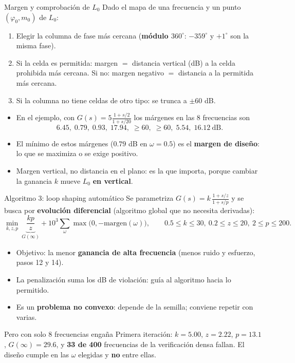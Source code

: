 \documentclass[aspectratio=169,11pt]{beamer}
\begin{document}
\begin{frame}{Margen y comprobación de $L_0$}
  \small
  Dado el mapa de una frecuencia y un punto $(\varphi_0,m_0)$ de $L_0$:
  \begin{enumerate}
    \item Elegir la columna de fase más cercana (\textbf{módulo $360^\circ$}: $-359^\circ$ y $+1^\circ$ son la misma fase).
    \item Si la celda es permitida: margen $=$ distancia vertical (dB) a la celda prohibida más cercana. Si no: margen negativo $=$ distancia a la permitida más cercana.
    \item Si la columna no tiene celdas de otro tipo: se trunca a $\pm60$ dB.
  \end{enumerate}
  \begin{itemize}
    \item En el ejemplo, con $G(s)=5\frac{1+s/2}{1+s/20}$ los márgenes en las 8 frecuencias son
    \[ 6.45,\;0.79,\;0.93,\;17.94,\;\ge60,\;\ge60,\;5.54,\;16.12\ \text{dB}. \]
    \item El mínimo de estos márgenes ($0.79$ dB en $\omega=0.5$) es el \textbf{margen de diseño}: lo que se maximiza o se exige positivo.
    \item Margen vertical, no distancia en el plano: es la que importa, porque cambiar la ganancia $k$ mueve $L_0$ \textbf{en vertical}.
  \end{itemize}
\end{frame}

\begin{frame}{Algoritmo 3: loop shaping automático}
  \footnotesize
  Se parametriza $G(s)=k\,\frac{1+s/z}{1+s/p}$ y se busca por \textbf{evolución diferencial} (algoritmo global que no necesita derivadas):
  \[ \min_{k,z,p}\ \underbrace{\frac{kp}{z}}_{G(\infty)}+10^3\sum_\omega\max\big(0,-\text{margen}(\omega)\big),\qquad 0.5\le k\le30,\ 0.2\le z\le20,\ 2\le p\le200. \]
  \begin{itemize}
    \item Objetivo: la menor \textbf{ganancia de alta frecuencia} (menos ruido y esfuerzo, pasos 12 y 14).
    \item La penalización suma los dB de violación: guía al algoritmo hacia lo permitido.
    \item Es un \textbf{problema no convexo}: depende de la semilla; conviene repetir con varias.
  \end{itemize}
  \begin{alertblock}{Pero con solo 8 frecuencias engaña}
    Primera iteración: $k=5.00$, $z=2.22$, $p=13.1$, $G(\infty)=29.6$, y \textbf{33 de 400} frecuencias de la verificación densa fallan. El diseño cumple en las $\omega$ elegidas y \textbf{no} entre ellas.
  \end{alertblock}
\end{frame}
\end{document}
